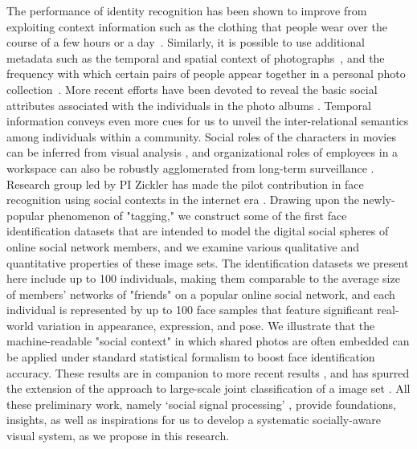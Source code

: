 The performance of identity recognition has been shown to improve from exploiting context information such as the clothing that people wear over the course of a few hours or a day~\cite{anguelov2007cir, zhang2003aah,  song2006cah, sivic2006fpr}. Similarly, it is possible to use additional metadata such as the temporal and spatial context of photographs~\cite{naaman2005lcr, zhao2006apa}, and the frequency with which certain pairs of people appear together in a personal photo collection~\cite{anguelov2007cir}. More recent efforts have been devoted to reveal the basic social attributes associated with the individuals in the photo albums \cite{Gallagher,Wang2010}. Temporal information conveys even more cues for us to unveil the inter-relational semantics among individuals within a community. Social roles of the characters in movies can be inferred from visual analysis \cite{Ding2010,Ding2011}, and organizational roles of employees in a workspace can also be robustly agglomerated from long-term surveillance \cite{Yu2009,Zhang2011}. Research group led by PI Zickler has made the pilot contribution in face recognition using social contexts in the internet era \cite{Stone2008,Stone2010}. Drawing upon the newly-popular phenomenon of "tagging," we construct some of the first face identification datasets that are intended to model the digital social spheres of online social network members, and we examine various qualitative and quantitative properties of these image sets. The identification datasets we present here include up to 100 individuals, making them comparable to the average size of members' networks of "friends" on a popular online social network, and each individual is represented by up to 100 face samples that feature significant real-world variation in appearance, expression, and pose. We illustrate that the machine-readable "social context" in which shared photos are often embedded can be applied under standard statistical formalism to boost face identification accuracy. These results are in companion to more recent results \cite{Dikmen:classify,LeeBMVC2011,Murillo2012,Poppe2012}, and has spurred the extension of the approach to large-scale joint classification of a image set \cite{McAuley:socialclassify}. All these preliminary work, namely `social signal processing' \cite{Pantic}, provide foundations, insights, as well as inspirations for us to develop a systematic socially-aware visual system, as we propose in this research. 


